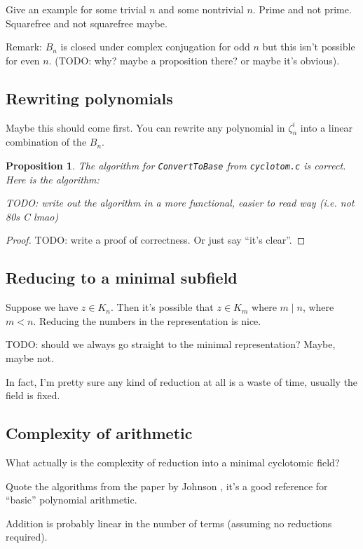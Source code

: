 \documentclass{article}
\newtheorem{prop}{Proposition}
\begin{document}
Give an example for some trivial $n$ and some nontrivial $n$. Prime
and not prime. Squarefree and not squarefree maybe.

Remark: $B_n$ is closed under complex conjugation for odd $n$ but this
isn't possible for even $n$. (TODO: why? maybe a proposition there? or
maybe it's obvious).

\subsection{Rewriting polynomials}

Maybe this should come first. You can rewrite any polynomial in
$\zeta_n^i$ into a linear combination of the $B_n$.

\begin{prop}
  The algorithm for {\tt ConvertToBase} from {\tt cyclotom.c} is
  correct. Here is the algorithm:

  TODO: write out the algorithm in a more functional, easier to read
  way (i.e. not 80s C lmao)
\end{prop}

\begin{proof}
TODO: write a proof of correctness. Or just say ``it's clear''.
\end{proof}

\subsection{Reducing to a minimal subfield}

Suppose we have $z \in K_n$. Then it's possible that $z \in K_m$ where
$m \mid n$, where $m < n$. Reducing the numbers in the representation
is nice.

TODO: should we always go straight to the minimal representation?
Maybe, maybe not.

In fact, I'm pretty sure any kind of reduction at all is a waste of
time, usually the field is fixed.

\subsection{Complexity of arithmetic}

What actually is the complexity of reduction into a minimal cyclotomic
field?

Quote the algorithms from the paper by Johnson \cite{Johnson1974},
it's a good reference for ``basic'' polynomial arithmetic.

Addition is probably linear in the number of terms (assuming no
reductions required).
\end{document}
